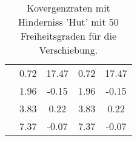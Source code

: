 \begin{table}
\begin{tabular}{c|cc|cc|}
\multicolumn{1}{|c|}{} & \multicolumn{1}{|c|}{      0.72} & \multicolumn{1}{|c|}{     17.47} & \multicolumn{1}{|c|}{      0.72} & \multicolumn{1}{|c|}{     17.47} \\ 
\multicolumn{1}{|c|}{} & \multicolumn{1}{|c|}{      1.96} & \multicolumn{1}{|c|}{     -0.15} & \multicolumn{1}{|c|}{      1.96} & \multicolumn{1}{|c|}{     -0.15} \\ 
\multicolumn{1}{|c|}{} & \multicolumn{1}{|c|}{      3.83} & \multicolumn{1}{|c|}{      0.22} & \multicolumn{1}{|c|}{      3.83} & \multicolumn{1}{|c|}{      0.22} \\ 
\multicolumn{1}{|c|}{} & \multicolumn{1}{|c|}{      7.37} & \multicolumn{1}{|c|}{     -0.07} & \multicolumn{1}{|c|}{      7.37} & \multicolumn{1}{|c|}{     -0.07} \\ 
\hline 
\end{tabular}\caption{Kovergenzraten mit Hinderniss 'Hut' mit 50 Freiheitsgraden für die Verschiebung.}\label{tab:Rate_Hut_level1}
\end{table} 

